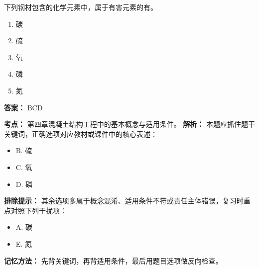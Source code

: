 \documentclass[UTF8,fontset=fandol,11pt]{ctexart}
\begin{document}
\vspace{0.2em}

\begin{quizbox}[title={第 11 题}]
下列钢材包含的化学元素中，属于有害元素的有。\\
\begin{enumerate}[label=\Alph*.]
\item 碳
\item 硫
\item 氧
\item 磷
\item 氮
\end{enumerate}
\textbf{答案：} BCD
\vspace{0.25em}
\begin{answerbox}[title={考点解析}]
\textbf{考点：} 第四章混凝土结构工程中的基本概念与适用条件。
\textbf{解析：} 本题应抓住题干关键词，正确选项对应教材或课件中的核心表述：
\begin{itemize}
\item B. 硫
\item C. 氧
\item D. 磷
\end{itemize}
\textbf{排除提示：} 其余选项多属于概念混淆、适用条件不符或责任主体错误，复习时重点对照下列干扰项：
\begin{itemize}
\item A. 碳
\item E. 氮
\end{itemize}
\textbf{记忆方法：} 先背关键词，再背适用条件，最后用题目选项做反向检查。
\end{answerbox}
\end{quizbox}

\vspace{0.2em}
\end{document}
